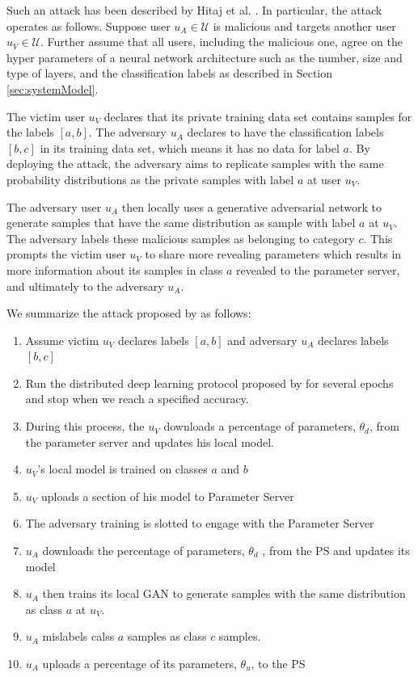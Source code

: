 \documentclass[conference]{IEEEtran}
\begin{document}
Such an attack has been described by Hitaj et al. \cite{hitaj2017deep}. In particular, the attack operates as follows. 
Suppose user $u_A\in\mathcal{U}$ is malicious and targets another user $u_V\in\mathcal{U}$. Further assume that all users, including
the malicious one, agree on the hyper parameters of a neural network architecture such as the number, size and type of layers,  and the
classification labels as described in Section \ref{sec:systemModel}.

The victim user $u_V$ declares that its private training data set contains samples for the  labels $[a,b]$. The adversary
$u_A$ declares to have the classification labels $[b,c]$ in its training data set, which means it has no data for label $a$. By
deploying the attack, the adversary aims to replicate samples with the same probability distributions as the private samples with label
$a$ at user $u_V$.

The adversary user $u_A$ then locally uses a generative adversarial network to generate samples that have the same distribution as
sample with label $a$ at $u_V$. The adversary labels these malicious samples as belonging to category $c$. This prompts the victim 
user $u_V$ to share more revealing parameters which results in more information about
its samples in class $a$ revealed to the parameter server, and ultimately to the adversary $u_A$. 

We summarize the attack proposed by \cite{hitaj2017deep} as follows:
\begin {enumerate}
\item Assume victim $u_V$ declares labels $[a,b]$ and adversary $u_A$ declares labels $[b,c]$
\item Run the distributed deep learning protocol proposed by \cite{shokri2015privacy} for several epochs and stop when we reach a
specified accuracy.
\item During this process, the $u_V$ downloads a percentage 
of parameters, $\theta_d$,  from the parameter
server and updates his local model.
\item $u_V$'s local model is trained on classes $a$ and $b$
\item $u_V$ uploads a section of his model to Parameter Server
\item The adversary training is slotted to engage with the Parameter Server
\item $u_A$ downloads the percentage of parameters, $\theta_d$ , from the PS and updates its model
\item $u_A$ then trains its local GAN to generate samples with the same distribution as class $a$ at $u_V$.
\item $u_A$  mislabels calss $a$ samples as class $c$ samples.
\item $u_A$ uploads a percentage of its parameters, $\theta_u$, to the PS
\end {enumerate}
\end{document}
